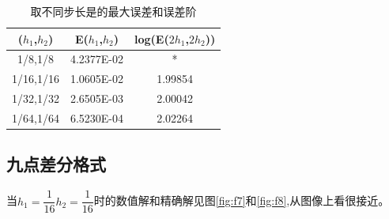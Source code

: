 \documentclass[withoutpreface,bwprint]{cumcmthesis} %
\begin{document}
\begin{table}[htbp]
	\centering
	\caption{取不同步长是的最大误差和误差阶}
	\begin{tabular}{ccc}
			\toprule[1.5pt]
		($h_1$,$h_2$) & E($h_1$,$h_2$) & log(E($2h_1$,$2h_2$)) \\
			\midrule[1pt]
		1/8,1/8 & 4.2377E-02 & * \\
		1/16,1/16 & 1.0605E-02 & 1.99854  \\
		1/32,1/32 & 2.6505E-03 & 2.00042  \\
		1/64,1/64 & 6.5230E-04 & 2.02264  \\
		\bottomrule[1.5pt]
	\end{tabular}%
	\label{tab:2}%
\end{table}%


\subsection{九点差分格式}
当$h_1=\dfrac{1}{16}$\quad$h_2=\dfrac{1}{16}$时的数值解和精确解见图\ref{fig:f7}和\ref{fig:f8},从图像上看很接近。
\end{document}
